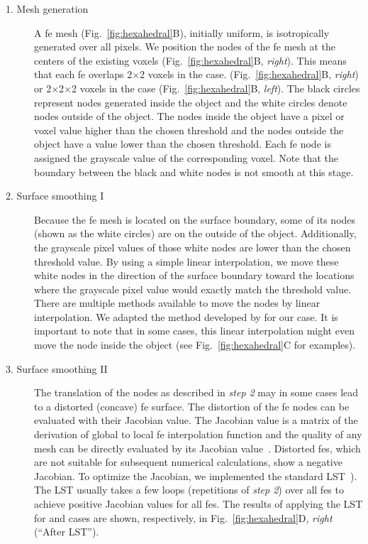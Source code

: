 \begin{description}
	\item[1. Mesh generation] A \ac{fe} mesh (Fig.~\ref{fig:hexahedral}B), initially uniform, is isotropically generated over all pixels. We position the nodes of the \ac{fe} mesh at the centers of the existing voxels (Fig.~\ref{fig:hexahedral}B, \textit{right}). This means that each \ac{fe} overlaps 2$\times$2 voxels in the \twod case. (Fig.~\ref{fig:hexahedral}B, \textit{right}) or 2$\times$2$\times$2 voxels in the \threed case (Fig.~\ref{fig:hexahedral}B, \textit{left}). The black circles represent nodes generated inside the object and the white circles denote nodes outside of the object. The nodes inside the object have a pixel or voxel value higher than the chosen threshold and the nodes outside the object have a value lower than the chosen threshold. Each \ac{fe} node is assigned the grayscale value of the corresponding voxel. Note that the boundary between the black and white nodes is not smooth at this stage.
	\item[2. Surface smoothing I] Because the \ac{fe} mesh is located on the surface boundary, some of its nodes (shown as the white circles) are on the outside of the object. Additionally, the grayscale pixel values of those white nodes are lower than the chosen threshold value. By using a simple linear interpolation, we move these white nodes in the direction of the surface boundary toward the locations where the grayscale pixel value would exactly match the threshold value. There are multiple methods available to move the nodes by linear interpolation. We adapted the method developed by \citet{Schneiders1996} for our \threed case. It is important to note that in some cases, this linear interpolation might even move the node inside the object (see Fig.~\ref{fig:hexahedral}C for examples).
	\item[3. Surface smoothing II] The translation of the nodes as described in \textit{step 2} may in some cases lead to a distorted (concave) \ac{fe} surface. The distortion of the \ac{fe} nodes can be evaluated with their Jacobian value. The Jacobian value is a matrix of the derivation of global to local \ac{fe} interpolation function and the quality of any mesh can be directly evaluated by its Jacobian value~\cite{Bathe1995}. Distorted \ac{fe}s, which are not suitable for subsequent numerical calculations, show a negative Jacobian. To optimize the Jacobian, we implemented the standard \ac{LST}~\cite{Freitag2000}). The \ac{LST} usually takes a few loops (repetitions of \textit{step 2}) over all \ac{fe}s to achieve positive Jacobian values for all \ac{fe}s. The results of applying the \ac{LST} for \threed and \twod cases are shown, respectively, in Fig.~\ref{fig:hexahedral}D, \textit{right} (``After \ac{LST}'').
\end{description}
